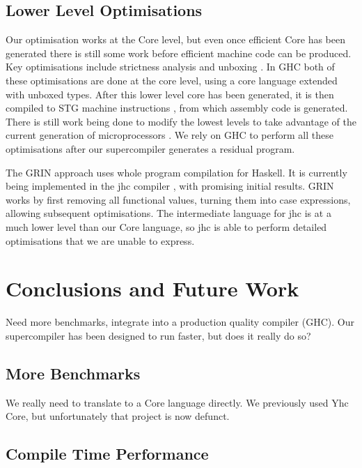 \documentclass[draft]{sigplanconf}
\begin{document}
\subsection{Lower Level Optimisations}

Our optimisation works at the Core level, but even once efficient Core has been generated there is still some work before efficient machine code can be produced. Key optimisations include strictness analysis and unboxing \cite{spj:unboxing}. In GHC both of these optimisations are done at the core level, using a core language extended with unboxed types. After this lower level core has been generated, it is then compiled to STG machine instructions \cite{spj:stg}, from which assembly code is generated. There is still work being done to modify the lowest levels to take advantage of the current generation of microprocessors \cite{marlow:pointer_tagging}. We rely on GHC to perform all these optimisations after our supercompiler generates a residual program.

The GRIN approach \cite{grin} uses whole program compilation for Haskell. It is currently being implemented in the jhc compiler \cite{jhc}, with promising initial results. GRIN works by first removing all functional values, turning them into case expressions, allowing subsequent optimisations. The intermediate language for jhc is at a much lower level than our Core language, so jhc is able to perform detailed optimisations that we are unable to express.

\section{Conclusions and Future Work}


Need more benchmarks, integrate into a production quality compiler (GHC). Our supercompiler has been designed to run faster, but does it really do so?

\subsection{More Benchmarks}

We really need to translate to a Core language directly. We previously used Yhc Core, but unfortunately that project is now defunct. 

\subsection{Compile Time Performance}
\end{document}
